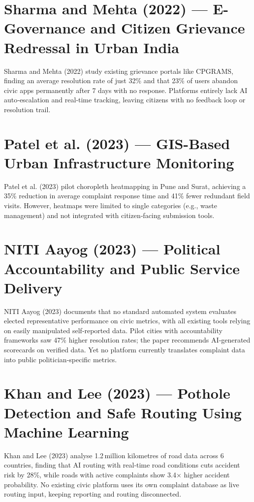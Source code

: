 \documentclass[12pt,a4paper]{report}
\begin{document}
\section{Sharma and Mehta (2022) --- E-Governance and Citizen Grievance Redressal in Urban India}

Sharma and Mehta (2022) study existing grievance portals like CPGRAMS, finding an average resolution rate of just 32\% and that 23\% of users abandon civic apps permanently after 7 days with no response. Platforms entirely lack AI auto‑escalation and real‑time tracking, leaving citizens with no feedback loop or resolution trail.

\section{Patel et al. (2023) --- GIS-Based Urban Infrastructure Monitoring}

Patel et al. (2023) pilot choropleth heatmapping in Pune and Surat, achieving a 35\% reduction in average complaint response time and 41\% fewer redundant field visits. However, heatmaps were limited to single categories (e.g., waste management) and not integrated with citizen‑facing submission tools.

\section{NITI Aayog (2023) --- Political Accountability and Public Service Delivery}

NITI Aayog (2023) documents that no standard automated system evaluates elected representative performance on civic metrics, with all existing tools relying on easily manipulated self‑reported data. Pilot cities with accountability frameworks saw 47\% higher resolution rates; the paper recommends AI‑generated scorecards on verified data. Yet no platform currently translates complaint data into public politician‑specific metrics.

\section{Khan and Lee (2023) --- Pothole Detection and Safe Routing Using Machine Learning}

Khan and Lee (2023) analyse 1.2 million kilometres of road data across 6 countries, finding that AI routing with real‑time road conditions cuts accident risk by 28\%, while roads with active complaints show 3.4× higher accident probability. No existing civic platform uses its own complaint database as live routing input, keeping reporting and routing disconnected.
\end{document}
